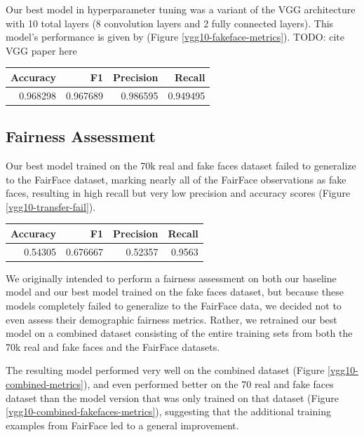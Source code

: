 \documentclass[11pt, letterpaper]{article}
\newenvironment{Figure}
  {\par\medskip\noindent\minipage{\linewidth}}
  {\endminipage\par\medskip}
\begin{document}
\begin{multicols}{2}
  Our best model in hyperparameter tuning was a variant of the VGG architecture
  with 10 total layers (8 convolution layers and 2 fully connected layers).
  This model's performance is given by (Figure \ref{vgg10-fakeface-metrics}).
  TODO: cite VGG paper here

  \begin{Figure}
    \centering
    \label{vgg10-fakeface-metrics}
    \begin{tabular}{rrrr}
    \toprule
     Accuracy &        F1 &  Precision &    Recall \\
    \midrule
     0.968298 &  0.967689 &   0.986595 &  0.949495 \\
    \bottomrule
    \end{tabular}
  \end{Figure}
    

  \subsection{Fairness Assessment}

  Our best model trained on the 70k real and fake faces dataset failed to
  generalize to the FairFace dataset, marking nearly all of the FairFace
  observations as fake faces, resulting in high recall but very low precision
  and accuracy scores (Figure \ref{vgg10-transfer-fail}).

  \begin{Figure}
    \centering
    \label{vgg10-transfer-fail}
    \begin{tabular}{rrrr}
    \toprule
    Accuracy &        F1 &  Precision &  Recall \\
    \midrule
      0.54305 &  0.676667 &    0.52357 &  0.9563 \\
    \bottomrule
    \end{tabular}
  \end{Figure}

  We originally intended to perform a fairness assessment on both our baseline
  model and our best model trained on the fake faces dataset, but because 
  these models completely failed to generalize to the FairFace data,
  we decided not to even assess their demographic fairness metrics. Rather, we
  retrained our best model on a combined dataset consisting of the entire
  training sets from both the 70k real and fake faces and the FairFace datasets.

  The resulting model performed very well on the combined dataset (Figure
  \ref{vgg10-combined-metrics}), and even performed better on the 70 real and
  fake faces dataset than the model version that was only trained on that
  dataset (Figure \ref{vgg10-combined-fakefaces-metrics}), suggesting that the
  additional training examples from FairFace led to a general improvement. 


\end{multicols}
\end{document}
